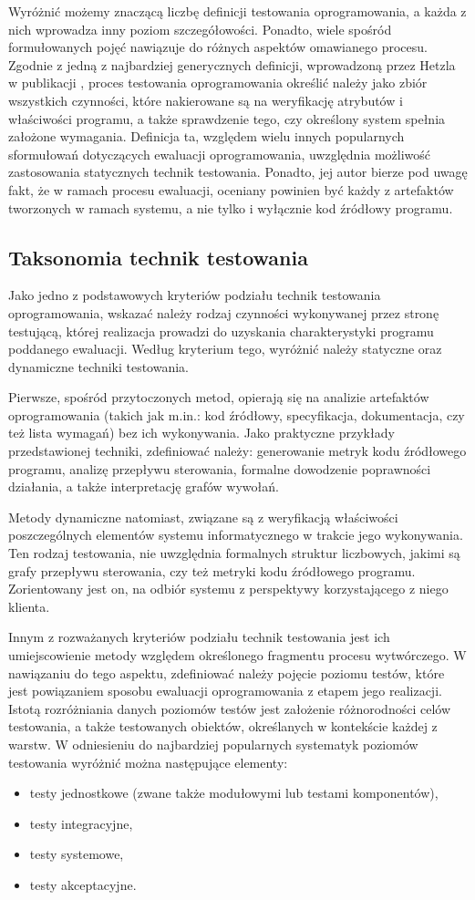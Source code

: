 Wyróżnić możemy znaczącą liczbę definicji testowania oprogramowania, a każda z nich wprowadza inny poziom szczegółowości. Ponadto, wiele spośród formułowanych pojęć nawiązuje do różnych aspektów omawianego procesu. Zgodnie z jedną z najbardziej generycznych definicji, wprowadzoną przez Hetzla w publikacji \cite{hetzel}, proces testowania oprogramowania określić należy jako zbiór wszystkich czynności, które nakierowane są na weryfikację atrybutów i właściwości programu, a także sprawdzenie tego, czy określony system spełnia założone wymagania. Definicja ta, względem wielu innych popularnych sformułowań dotyczących ewaluacji oprogramowania, uwzględnia możliwość zastosowania statycznych technik testowania. Ponadto, jej autor bierze pod uwagę fakt, że w ramach procesu ewaluacji, oceniany powinien być każdy z artefaktów tworzonych w ramach systemu, a nie tylko i wyłącznie kod źródłowy programu.
\subsection*{Taksonomia technik testowania}
Jako jedno z podstawowych kryteriów podziału technik testowania oprogramowania, wskazać należy rodzaj czynności wykonywanej przez stronę testującą, której realizacja prowadzi do uzyskania charakterystyki programu poddanego ewaluacji. Według kryterium tego, wyróżnić należy statyczne oraz dynamiczne techniki testowania.

Pierwsze, spośród przytoczonych metod, opierają się na analizie artefaktów oprogramowania (takich jak m.in.: kod źródłowy, specyfikacja, dokumentacja, czy też lista wymagań) bez ich wykonywania. Jako praktyczne przykłady przedstawionej techniki, zdefiniować należy: generowanie metryk kodu źródłowego programu, analizę przepływu sterowania, formalne dowodzenie poprawności działania, a także interpretację grafów wywołań.

Metody dynamiczne natomiast, związane są z weryfikacją właściwości poszczególnych elementów systemu informatycznego w trakcie jego wykonywania. Ten rodzaj testowania, nie uwzględnia formalnych struktur liczbowych, jakimi są grafy przepływu sterowania, czy też metryki kodu źródłowego programu. Zorientowany jest on, na odbiór systemu z perspektywy korzystającego z niego klienta.

Innym z rozważanych kryteriów podziału technik testowania jest ich umiejscowienie metody względem określonego fragmentu procesu wytwórczego. W nawiązaniu do tego aspektu, zdefiniować należy pojęcie poziomu testów, które jest powiązaniem sposobu ewaluacji oprogramowania z etapem jego realizacji. Istotą rozróżniania danych poziomów testów jest założenie różnorodności celów testowania, a także testowanych obiektów, określanych w kontekście każdej z warstw. W odniesieniu do najbardziej popularnych systematyk poziomów testowania wyróżnić można następujące elementy:
\begin{itemize}
    \item testy jednostkowe (zwane także modułowymi lub testami komponentów),
    \item testy integracyjne,
    \item testy systemowe,
    \item testy akceptacyjne.
\end{itemize}

